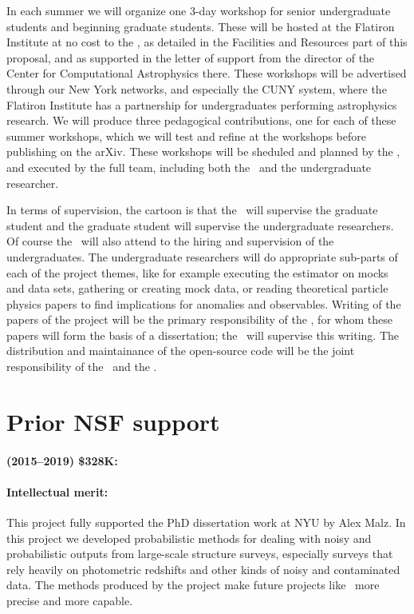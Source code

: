 \documentclass[12pt, fullpage, letterpaper]{article}
\begin{document}
In each summer we will organize one 3-day workshop for senior undergraduate students and beginning
graduate students. These will be hosted at the Flatiron Institute at no cost to the \PI, as detailed
in the Facilities and Resources part of this proposal, and as supported in the letter of support from the director of the Center for Computational Astrophysics there.
These workshops will be advertised through our New York networks, and especially the CUNY system, where the Flatiron Institute has a partnership for undergraduates performing astrophysics research.
We will produce three pedagogical contributions, one for each of these summer workshops, which we will test and refine at the workshops before publishing on the arXiv.
These workshops will be sheduled and planned by the \PI, and executed by the full team, including both the \GRA\ and the undergraduate researcher.

In terms of supervision, the cartoon is that the \PI\ will supervise the graduate student and the graduate student will supervise the undergraduate researchers.
Of course the \PI\ will also attend to the hiring and supervision of the undergraduates.
The undergraduate researchers will do appropriate sub-parts of each of the project themes, like for example executing the estimator on mocks and data sets, gathering or creating mock data, or reading theoretical particle physics papers to find implications for anomalies and observables.
Writing of the papers of the project will be the primary responsibility of the \GRA, for whom these papers will form the basis of a dissertation; the \PI\ will supervise this writing.
The distribution and maintainance of the open-source code will be the joint responsibility of the \PI\ and the \GRA.

\section{Prior NSF support}

\paragraph{
(2015--2019) \$328K:}

\paragraph{Intellectual merit:}
This project fully supported the PhD dissertation work at NYU by Alex
Malz. In this project we developed probabilistic methods for dealing
with noisy and probabilistic outputs from large-scale structure surveys,
especially surveys that rely heavily on photometric redshifts and other
kinds of noisy and contaminated data.
The methods produced by the project make future projects like \LSST\ more
precise and more capable.
\end{document}
